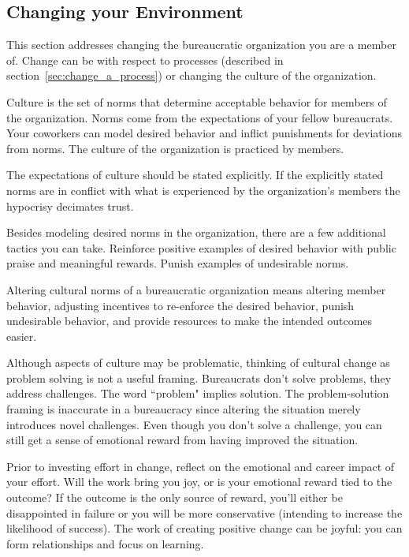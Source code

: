 \subsection{Changing your Environment}


This section addresses changing the bureaucratic organization you are a member of. Change can be with respect to processes (described in section~\ref{sec:change_a_process}) or changing the \gls{culture} of the organization.

Culture is the set of norms that determine acceptable behavior for members of the organization. Norms come from the expectations of your fellow bureaucrats. Your coworkers can model desired behavior and inflict punishments for deviations from norms. The culture of the organization is practiced by members. 

The expectations of culture should be stated explicitly. If the explicitly stated norms are in conflict with what is experienced by the organization's members the hypocrisy decimates trust. 

Besides modeling desired norms in the organization, there are a few additional tactics you can take. 
Reinforce positive examples of desired behavior with public praise and meaningful rewards. Punish examples of undesirable norms. 

Altering cultural norms of a bureaucratic organization means altering member behavior, adjusting incentives to re-enforce the desired behavior, punish undesirable behavior, and provide resources to make the intended outcomes easier. 

Although aspects of culture may be problematic, thinking of cultural change as problem solving is not a useful framing. Bureaucrats don't solve problems, they address challenges. The word ``problem" implies solution. The problem-solution framing is inaccurate in a bureaucracy since altering the situation merely introduces novel challenges. 
Even though you don't solve a challenge, you can still get a sense of emotional reward from having improved the situation. 

Prior to investing effort in change, reflect on the emotional and career impact of your effort. Will the work bring you joy, or is your emotional reward tied to the outcome? If the outcome is the only source of reward, you'll either be disappointed in failure or you will be more conservative (intending to increase the likelihood of success). The work of creating positive change can be joyful: you can form relationships and focus on learning. 

